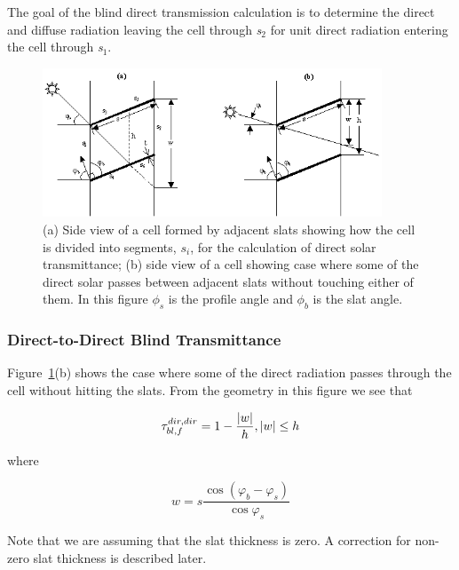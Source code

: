 The goal of the blind direct transmission calculation is to determine the direct and diffuse radiation leaving the cell through \emph{s\(_{2}\)} for unit direct radiation entering the cell through \emph{s\(_{1}\)}.

\begin{figure}[hbtp] %
\centering
\includegraphics[width=0.9\textwidth, height=0.9\textheight, keepaspectratio=true]{media/image1034.png}
\caption{(a) Side view of a cell formed by adjacent slats showing how the cell is divided into segments, \(s_i\),  for the calculation of direct solar transmittance; (b) side view of a cell showing case where some of the direct solar passes between adjacent slats without touching either of them. In this figure \(\phi_s\) is the profile angle and \(\phi_b\) is the slat angle. \label{fig:a-side-view-of-a-cell-formed-by-adjacent}}
\end{figure}

\subsubsection{Direct-to-Direct Blind Transmittance}\label{direct-to-direct-blind-transmittance}

Figure~\ref{fig:a-side-view-of-a-cell-formed-by-adjacent}(b) shows the case where some of the direct radiation passes through the cell without hitting the slats. From the geometry in this figure we see that

\begin{equation}
\tau_{bl,f}^{dir,dir} = 1 - \frac{{|w|}}{h},{\rm{       }}|w|{\rm{ }} \le {\rm{ }}h
\end{equation}

where

\begin{equation}
w = s\frac{{\cos ({\varphi_b} - {\varphi_s})}}{{\cos {\varphi_s}}}
\end{equation}

Note that we are assuming that the slat thickness is zero. A correction for non-zero slat thickness is described later.

